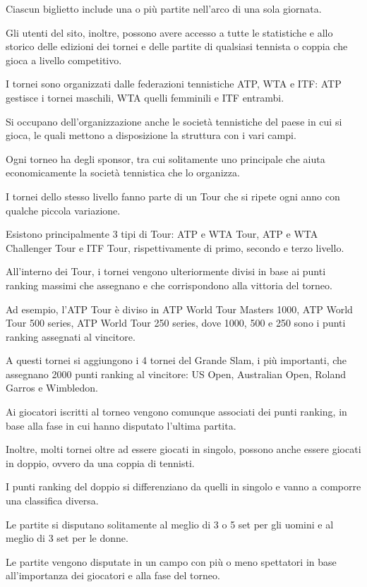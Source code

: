 \documentclass[10pt]{article}
\newcommand{\spazia}{\par\medskip}
\begin{document}
Ciascun biglietto include una o più partite nell'arco di una sola giornata.\spazia

Gli utenti del sito, inoltre, possono avere accesso a tutte le statistiche e allo storico delle edizioni dei tornei e delle partite di qualsiasi tennista o coppia che gioca a livello competitivo.\spazia

I tornei sono organizzati dalle federazioni tennistiche ATP, WTA e ITF: ATP gestisce i tornei maschili, WTA quelli femminili e ITF entrambi.

Si occupano dell'organizzazione anche le società tennistiche del paese in cui si gioca, le quali mettono a disposizione la struttura con i vari campi.

Ogni torneo ha degli sponsor, tra cui solitamente uno principale che aiuta economicamente la società tennistica che lo organizza.\spazia

I tornei dello stesso livello fanno parte di un Tour che si ripete ogni anno con qualche piccola variazione. 

Esistono principalmente 3 tipi di Tour: ATP e WTA Tour, ATP e WTA Challenger Tour e ITF Tour, rispettivamente di primo, secondo e terzo livello.\spazia

All'interno dei Tour, i tornei vengono ulteriormente divisi in base ai punti ranking massimi che assegnano e che corrispondono alla vittoria del torneo. 

Ad esempio, l'ATP Tour è diviso in  ATP World Tour Masters 1000, ATP World Tour 500 series, ATP World Tour 250 series, dove 1000, 500 e 250 sono i punti ranking assegnati al vincitore.

A questi tornei si aggiungono i 4 tornei del Grande Slam, i più importanti, che assegnano 2000 punti ranking al vincitore: US Open, Australian Open, Roland Garros e Wimbledon.\spazia

Ai giocatori iscritti al torneo vengono comunque associati dei punti ranking, in base alla fase in cui hanno disputato l'ultima partita.

Inoltre, molti tornei oltre ad essere giocati in singolo, possono anche essere giocati in doppio, ovvero da una coppia di tennisti. 

I punti ranking del doppio si differenziano da quelli in singolo e vanno a comporre una classifica diversa.\spazia

Le partite si disputano solitamente al meglio di 3 o 5 set per gli uomini e al meglio di 3 set per le donne.\spazia

Le partite vengono disputate in un campo con più o meno spettatori in base all'importanza dei giocatori e alla fase del torneo.
\end{document}
